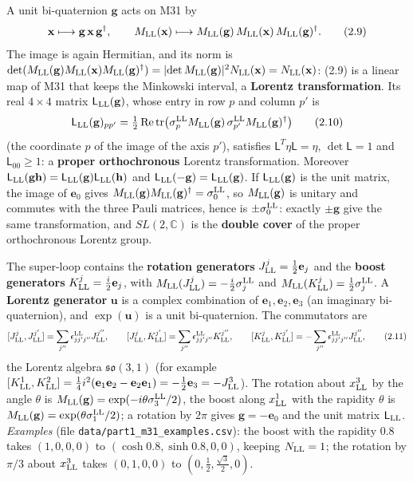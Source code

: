 \documentclass[
  10pt,
]{article}
\begin{document}
A unit bi-quaternion \(\mathbf g\) acts on M31 by
\[\mathbf x\longmapsto\mathbf g\,\mathbf x\,\mathbf g^\dagger,\qquad M_{\rm LL}(\mathbf x)\longmapsto M_{\rm LL}(\mathbf g)\,M_{\rm LL}(\mathbf x)\,M_{\rm LL}(\mathbf g)^\dagger.\tag{2.9}\]
The image is again Hermitian, and its norm is
\(\det(M_{\rm LL}(\mathbf g)M_{\rm LL}(\mathbf x)M_{\rm LL}(\mathbf g)^\dagger)=\lvert\det M_{\rm LL}(\mathbf g)\rvert^2N_{\rm LL}(\mathbf x)=N_{\rm LL}(\mathbf x)\):
(2.9) is a linear map of M31 that keeps the Minkowski interval, a
\textbf{Lorentz transformation}. Its real \(4\times4\) matrix
\(\mathsf L_{\rm LL}(\mathbf g)\), whose entry in row \(p\) and column
\(p'\) is
\[\mathsf L_{\rm LL}(\mathbf g)_{pp'}=\tfrac12\,\mathrm{Re}\,\mathrm{tr}\big(\sigma^{\rm LL}_pM_{\rm LL}(\mathbf g)\,\sigma^{\rm LL}_{p'}M_{\rm LL}(\mathbf g)^\dagger\big)\tag{2.10}\]
(the coordinate \(p\) of the image of the axis \(p'\)), satisfies
\(\mathsf L^T\eta\mathsf L=\eta\), \(\det\mathsf L=1\) and
\(\mathsf L_{00}\ge1\): a \textbf{proper orthochronous} Lorentz
transformation. Moreover
\(\mathsf L_{\rm LL}(\mathbf g\mathbf h)=\mathsf L_{\rm LL}(\mathbf g)\mathsf L_{\rm LL}(\mathbf h)\)
and \(\mathsf L_{\rm LL}(-\mathbf g)=\mathsf L_{\rm LL}(\mathbf g)\). If
\(\mathsf L_{\rm LL}(\mathbf g)\) is the unit matrix, the image of
\(\mathbf e_0\) gives
\(M_{\rm LL}(\mathbf g)M_{\rm LL}(\mathbf g)^\dagger=\sigma^{\rm LL}_0\),
so \(M_{\rm LL}(\mathbf g)\) is unitary and commutes with the three
Pauli matrices, hence is \(\pm\sigma^{\rm LL}_0\): exactly
\(\pm\mathbf g\) give the same transformation, and \(SL(2,\mathbb C)\)
is the \textbf{double cover} of the proper orthochronous Lorentz group.

The super-loop contains the \textbf{rotation generators}
\(J^j_{\rm LL}=\tfrac12\mathbf e_j\) and the \textbf{boost generators}
\(K^j_{\rm LL}=\tfrac i2\mathbf e_j\), with
\(M_{\rm LL}(J^j_{\rm LL})=-\tfrac i2\sigma^{\rm LL}_j\) and
\(M_{\rm LL}(K^j_{\rm LL})=\tfrac12\sigma^{\rm LL}_j\). A
\textbf{Lorentz generator} \(\mathbf u\) is a complex combination of
\(\mathbf e_1,\mathbf e_2,\mathbf e_3\) (an imaginary bi-quaternion),
and \(\exp(\mathbf u)\) is a unit bi-quaternion. The commutators are
\[[J^j_{\rm LL},J^{j'}_{\rm LL}]=\sum_{j''}\epsilon^{\rm LL}_{jj'j''}J^{j''}_{\rm LL},\qquad[J^j_{\rm LL},K^{j'}_{\rm LL}]=\sum_{j''}\epsilon^{\rm LL}_{jj'j''}K^{j''}_{\rm LL},\qquad[K^j_{\rm LL},K^{j'}_{\rm LL}]=-\sum_{j''}\epsilon^{\rm LL}_{jj'j''}J^{j''}_{\rm LL},\tag{2.11}\]
the Lorentz algebra \(\mathfrak{so}(3,1)\) (for example
\([K^1_{\rm LL},K^2_{\rm LL}]=\tfrac14i^2(\mathbf e_1\mathbf e_2-\mathbf e_2\mathbf e_1)=-\tfrac12\mathbf e_3=-J^3_{\rm LL}\)).
The rotation about \(x^3_{\rm LL}\) by the angle \(\theta\) is
\(M_{\rm LL}(\mathbf g)=\exp(-i\theta\sigma^{\rm LL}_3/2)\), the boost
along \(x^1_{\rm LL}\) with the rapidity \(\theta\) is
\(M_{\rm LL}(\mathbf g)=\exp(\theta\sigma^{\rm LL}_1/2)\); a rotation by
\(2\pi\) gives \(\mathbf g=-\mathbf e_0\) and the unit matrix
\(\mathsf L_{\rm LL}\). \emph{Examples} (file
\texttt{data/part1\_m31\_examples.csv}): the boost with the rapidity 0.8
takes \((1,0,0,0)\) to \((\cosh0.8,\sinh0.8,0,0)\), keeping
\(N_{\rm LL}=1\); the rotation by \(\pi/3\) about \(x^3_{\rm LL}\) takes
\((0,1,0,0)\) to \((0,\tfrac12,\tfrac{\sqrt3}2,0)\).
\end{document}
